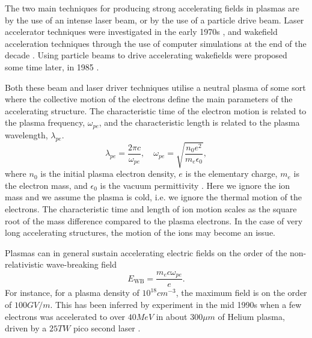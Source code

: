 The two main techniques for producing strong accelerating fields in plasmas are by the use of an intense laser beam, or by the use of a particle drive beam. Laser accelerator techniques were investigated in the early 1970s \cite{chan:1971, palmer:1972}, and wakefield acceleration techniques through the use of computer simulations at the end of the decade \cite{tajima:1979}. Using particle beams to drive accelerating wakefields were proposed some time later, in 1985 \cite{chen:1985}.

Both these beam and laser driver techniques utilise a neutral plasma of some sort where the collective motion of the electrons define the main parameters of the accelerating structure. The characteristic time of the electron motion is related to the plasma frequency, $\omega_{pe}$, and the characteristic length is related to the plasma wavelength, $\lambda_{pe}$.
\begin{equation}
    \lambda_{pe} = \frac{2\pi c}{\omega_{pe}}, \quad
    \omega_{pe}  = \sqrt{\frac{n_{0}e^{2}}{m_{e}\epsilon_{0}}}, \label{EQ:PWFA:L0W0}
\end{equation}
where $n_{0}$ is the initial plasma electron density, $e$ is the elementary charge, $m_{e}$ is the electron mass, and $\epsilon_{0}$ is the vacuum permittivity \cite{tonks:1929, esarey:1996, pecseli:2012}. Here we ignore the ion mass and we assume the plasma is cold, i.e. we ignore the thermal motion of the electrons. The characteristic time and length of ion motion scales as the square root of the mass difference compared to the plasma electrons. In the case of very long accelerating structures, the motion of the ions may become an issue.

Plasmas can in general sustain accelerating electric fields on the order of the non-relativistic wave-breaking field \cite{dawson:1959, esarey:1996}
\begin{equation}
    E_{\mathrm{WB}} = \frac{m_{e} c \omega_{pe}}{e}. \label{EQ:EWB}
\end{equation}
For instance, for a plasma density of $10^{18}\unit{cm}^{-3}$, the maximum field is on the order of $100\unit{GV/m}$. This has been inferred by experiment in the mid 1990s when a few electrons was accelerated to over $40\unit{MeV}$ in about $300\unit{\mu m}$ of Helium plasma, driven by a $25\unit{TW}$ pico second laser \cite{modena:1995}.




